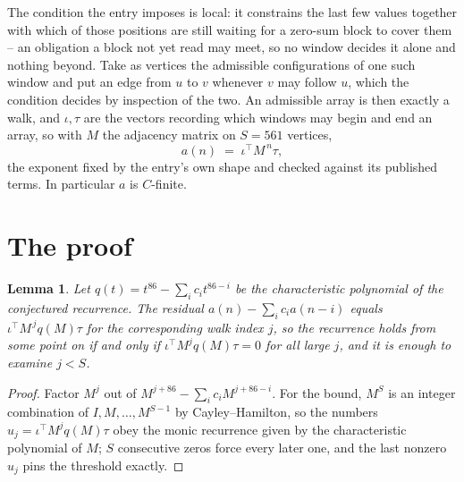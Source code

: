 \documentclass[11pt,a4paper]{article}
\theoremstyle{plain}
\newtheorem{lemma}[theorem]{Lemma}
\theoremstyle{definition}
\begin{document}
The condition the entry imposes is local: it constrains the last few values together with which of those positions are still waiting for a zero-sum block to cover them -- an obligation a block not yet read may meet, so no window decides it alone and nothing beyond. Take as vertices the admissible configurations of one such window and put an edge from $u$ to $v$ whenever $v$ may follow $u$, which the condition decides by inspection of the two.
An admissible array is then exactly a walk, and $\iota,\tau$ are the vectors recording which windows may begin and end an array, so with $M$ the adjacency matrix on $S=561$ vertices,
\[
a(n)\;=\;\iota^{\!\top}M^{\,n}\tau ,
\]
the exponent fixed by the entry's own shape and checked against its published terms. In
particular $a$ is $C$-finite.

\section{The proof}

\begin{lemma}\label{lem:crit}
Let $q(t)=t^{86}-\sum_i c_it^{86-i}$ be the characteristic polynomial of the
conjectured recurrence. The residual $a(n)-\sum_ic_ia(n-i)$ equals
$\iota^{\!\top}M^{\,j}q(M)\tau$ for the corresponding walk index $j$, so the recurrence
holds from some point on if and only if $\iota^{\!\top}M^{j}q(M)\tau=0$ for all large $j$,
and it is enough to examine $j<S$.
\end{lemma}

\begin{proof}
Factor $M^{j}$ out of $M^{j+86}-\sum_ic_iM^{j+86-i}$. For the bound, $M^{S}$
is an integer combination of $I,M,\dots,M^{S-1}$ by Cayley--Hamilton, so the numbers
$u_j=\iota^{\!\top}M^{j}q(M)\tau$ obey the monic recurrence given by the characteristic
polynomial of $M$; $S$ consecutive zeros force every later one, and the last nonzero $u_j$
pins the threshold exactly.
\end{proof}
\end{document}
